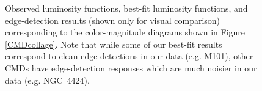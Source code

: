 \documentclass[twocolumn]{aastex62}
\begin{document}
\begin{figure}
\caption{Observed luminosity functions, best-fit luminosity functions, and edge-detection results (shown only for visual comparison) corresponding to the color-magnitude diagrams shown in Figure \ref{CMDcollage}. Note that while some of our best-fit results correspond to clean edge detections in our data (e.g. M101), other CMDs have edge-detection responses which are much noisier in our data (e.g. NGC~4424).}
\label{fig:LFcollage}
\end{figure}



\end{document}
